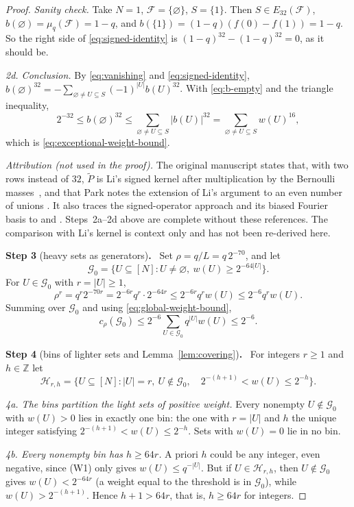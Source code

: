 \documentclass[11pt,letterpaper]{article}
\theoremstyle{definition}
\theoremstyle{remark}
\numberwithin{equation}{section}
\newcommand{\step}[2]{\medskip\noindent\textbf{Step #1} (#2)\textbf{.}\ }
\begin{document}
\begin{proof}
\emph{Sanity check.} Take $N=1$, $\mathcal F=\{\varnothing\}$,
$S=\{1\}$. Then $S\in E_{32}(\mathcal F)$,
$b(\varnothing)=\mu_q(\mathcal F)=1-q$, and
$b(\{1\})=(1-q)(f(0)-f(1))=1-q$. So the right side of
\eqref{eq:signed-identity} is $(1-q)^{32}-(1-q)^{32}=0$, as it should be.

\emph{2d. Conclusion.} By \eqref{eq:vanishing} and
\eqref{eq:signed-identity},
$b(\varnothing)^{32}=-\sum_{\varnothing\ne U\subseteq S}(-1)^{|U|}b(U)^{32}$.
With \eqref{eq:b-empty} and the triangle inequality,
\[
 2^{-32}\le b(\varnothing)^{32}
 \le\sum_{\varnothing\ne U\subseteq S}|b(U)|^{32}
 =\sum_{\varnothing\ne U\subseteq S}w(U)^{16},
\]
which is \eqref{eq:exceptional-weight-bound}.

\emph{Attribution (not used in the proof).} The original manuscript
states that, with two rows instead of $32$, $\widetilde P$ is Li's signed
kernel after multiplication by the Bernoulli
masses~\cite[Section~2]{Li26}, and that Park notes the extension of Li's
argument to an even number of unions
\cite[Corollary~3.5, footnote~3]{Park26}. It also traces the
signed-operator approach and its biased Fourier basis to
\cite[Section~2.2]{Friedgut08} and
\cite[Sections~2.2 and~4.1]{EllisFilmusFriedgut12}. Steps~2a--2d above are
complete without these references. The comparison with Li's kernel is
context only and has not been re-derived here.

\step{3}{heavy sets as generators}
Set $\rho=q/L=q\,2^{-70}$, and let
\[
 \mathcal G_0=
 \{U\subseteq[N]:U\ne\varnothing,\ w(U)\ge2^{-64|U|}\}.
\]
For $U\in\mathcal G_0$ with $r=|U|\ge1$,
\[
 \rho^r=q^r2^{-70r}=2^{-6r}q^r\cdot2^{-64r}
 \le2^{-6r}q^r w(U)
 \le2^{-6}q^r w(U).
\]
Summing over $\mathcal G_0$ and using \eqref{eq:global-weight-bound},
\begin{equation}\label{eq:outright-cost}
 c_\rho(\mathcal G_0)\le2^{-6}\sum_{U\in\mathcal G_0}q^{|U|}w(U)\le2^{-6}.
\end{equation}

\step{4}{bins of lighter sets and Lemma~\ref{lem:covering}}
For integers $r\ge1$ and $h\in\mathbb Z$ let
\[
 \mathcal H_{r,h}=
 \bigl\{U\subseteq[N]:|U|=r,\ U\notin\mathcal G_0,
 \quad 2^{-(h+1)}<w(U)\le2^{-h}\bigr\}.
\]

\emph{4a. The bins partition the light sets of positive weight.} Every
nonempty $U\notin\mathcal G_0$ with $w(U)>0$ lies in exactly one bin: the
one with $r=|U|$ and $h$ the unique integer satisfying
$2^{-(h+1)}<w(U)\le2^{-h}$. Sets with $w(U)=0$ lie in no bin.

\emph{4b. Every nonempty bin has $h\ge64r$.} A priori $h$ could be any
integer, even negative, since (W1) only gives $w(U)\le q^{-|U|}$. But if
$U\in\mathcal H_{r,h}$, then $U\notin\mathcal G_0$ gives $w(U)<2^{-64r}$
(a weight equal to the threshold is in $\mathcal G_0$), while
$w(U)>2^{-(h+1)}$. Hence $h+1>64r$, that is, $h\ge64r$ for integers.


\end{proof}
\end{document}
